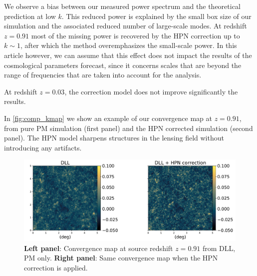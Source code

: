 \documentclass[twocolumn,twocolappendix]{aastex63}
\begin{document}
 We observe a bias between our measured power spectrum and the theoretical prediction at low $k$. This reduced power is explained by the small box size of our simulation and the associated reduced number of large-scale modes.  At redshift $z=0.91$ most of the missing
power is recovered by the HPN correction up to $k \sim 1$, after which the method overemphasizes the small-scale power. In this article however, we can assume that this effect does not impact the results of the cosmological parameters forecast, since it concerns scales that are beyond the range of frequencies that are taken into account for the analysis.

At redshift $z=0.03$, the correction model does not improve significantly the results.


In \autoref{fig:comp_kmap} we show an example of our convergence map at $ z= 0.91$, from pure PM simulation (first panel) and the HPN corrected simulation (second panel). The HPN model sharpens structures in the lensing field without introducing any artifacts.
\begin{figure}
    \centering
    \includegraphics[width=\textwidth]{paper/figures/kmap_dll_vs_hpn.pdf}
    \caption{ \textbf{Left panel}: Convergence map at source redshift $z= 0.91$ from DLL, PM only.
    \textbf{Right panel}: Same convergence map when the HPN correction is applied. 
    }
    \label{fig:comp_kmap}
\end{figure}
\end{document}
